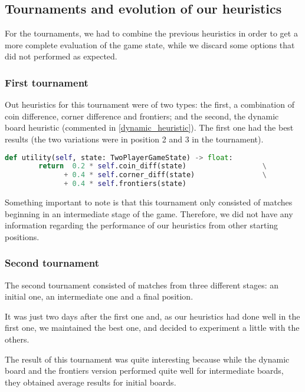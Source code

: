 \documentclass{article}
\begin{document}
\subsection{Tournaments and evolution of our heuristics}

For the tournaments, we had to combine the previous heuristics in order to get a more complete evaluation of the game state, while we discard some options that did not performed as expected.

\subsubsection{First tournament }

Out heuristics for this tournament were of two types: the first, a combination of coin difference, corner difference and frontiers; and the second, the dynamic board heuristic (commented in \ref{dynamic_heuristic}). The first one had the best results (the two variations were in position 2 and 3 in the tournament).

\pagebreak

\begin{lstlisting}[language=python,captionpos=t, caption=Tournament 2 -- our best (most successful) heuristic.]
    def utility(self, state: TwoPlayerGameState) -> float:
        return  0.2 * self.coin_diff(state)                  \
              + 0.4 * self.corner_diff(state)                \
              + 0.4 * self.frontiers(state)
\end{lstlisting}\label{winner}

Something important to note is that this tournament only consisted of matches beginning in an intermediate stage of the game. Therefore, we did not have any information regarding the performance of our heuristics from other starting positions.

\subsubsection{Second tournament }

The second tournament consisted of matches from three different stages: an initial one, an intermediate one and a final position. 

It was just two days after the first one and, as our heuristics had done well in the first one, we maintained the best one, and decided to experiment a little with the others.

The result of this tournament was quite interesting because while the dynamic board and the frontiers version performed quite well for intermediate boards, they obtained average results for initial boards.
\end{document}
